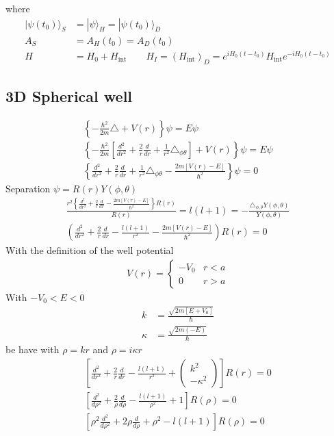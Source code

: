 \documentclass[10pt,a4paper]{book}
\theoremstyle{definition}
\begin{document}
where
\begin{align}
|\psi(t_0)\rangle_S&=|\psi\rangle_H=|\psi(t_0)\rangle_D\\
A_S&=A_H(t_0)=A_D(t_0)\\
H&=H_0+H_\text{int}\qquad H_I=(H_\text{int})_D=e^{iH_0(t-t_0)}H_\text{int}e^{-iH_0(t-t_0)}
\end{align}

\subsection{3D Spherical well}
\begin{align}
\left\{-\frac{\hbar^2}{2m}\triangle+V(r)\right\}\psi=E\psi\\
\left\{-\frac{\hbar^2}{2m}\left[\frac{d^2}{dr^2}+\frac{2}{r}\frac{d}{dr}+\frac{1}{r^2}\triangle_{\phi\theta}\right]+V(r)\right\}\psi=E\psi\\
\left\{\frac{d^2}{dr^2}+\frac{2}{r}\frac{d}{dr}+\frac{1}{r^2}\triangle_{\phi\theta}-\frac{2m[V(r)-E]}{\hbar^2}\right\}\psi=0
\end{align}
Separation $\psi=R(r)Y(\phi,\theta)$
\begin{align}
\frac{r^2\left\{\frac{d^2}{dr^2}+\frac{2}{r}\frac{d}{dr}-\frac{2m[V(r)-E]}{\hbar^2}\right\}R(r)}{R(r)}=l(l+1)=-\frac{\triangle_{\phi,\theta} Y(\phi,\theta)}{Y(\phi,\theta)}\\
\left(\frac{d^2}{dr^2}+\frac{2}{r}\frac{d}{dr}-\frac{l(l+1)}{r^2}-\frac{2m[V(r)-E]}{\hbar^2}\right)R(r)=0
\end{align}
With the definition of the well potential
\begin{align}
V(r)=\left\{\begin{matrix}
-V_0 & r<a\\
0 & r>a
\end{matrix}\right.
\end{align}
With $-V_0<E<0$
\begin{align}
k&=\frac{\sqrt{2m[E+V_0]}}{\hbar}\\
\kappa&=\frac{\sqrt{2m(-E)}}{\hbar}
\end{align}
be have with $\rho=kr$ and $\rho=i\kappa r$
\begin{align}
\left[\frac{d^2}{dr^2}+\frac{2}{r}\frac{d}{dr}-\frac{l(l+1)}{r^2}+
\left(\begin{matrix}
k^2\\
-\kappa^2
\end{matrix}\right)
\right]R(r)=0\\
\left[\frac{d^2}{d\rho^2}+\frac{2}{\rho}\frac{d}{d\rho}-\frac{l(l+1)}{\rho^2}+1\right]R(\rho)=0\\
\left[\rho^2\frac{d^2}{d\rho^2}+2\rho\frac{d}{d\rho}+\rho^2-l(l+1)\right]R(\rho)=0
\end{align}
\end{document}
